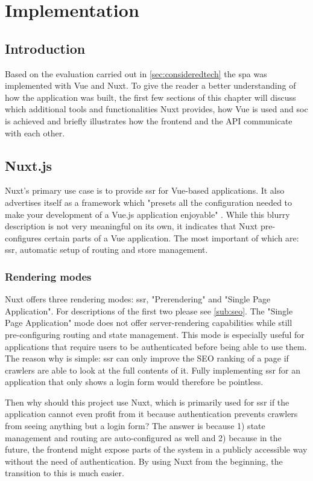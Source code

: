 \chapter[Implementation]{Implementation} \label{ch:implementation}

\section{Introduction}
Based on the evaluation carried out in \autoref{sec:consideredtech} the \acrlong{spa} was implemented with Vue and Nuxt. To give the reader a better understanding of how the application was built, the first few sections of this chapter will discuss which additional tools and functionalities Nuxt provides, how Vue is used and \acrfull{soc} is achieved and briefly illustrates how the frontend and the API communicate with each other. 

\section{Nuxt.js}
Nuxt's primary use case is to provide \acrlong{ssr} for Vue-based applications. It also advertises itself as a framework which "presets all the configuration needed to make your development of a Vue.js application enjoyable" \cite{Nuxtjs:online}. While this blurry description is not very meaningful on its own, it indicates that Nuxt pre-configures certain parts of a Vue application. The most important of which are: \acrlong{ssr}, automatic setup of routing and store management.

\subsection{Rendering modes}
Nuxt offers three rendering modes: \acrshort{ssr}, "Prerendering" and "Single Page Application". For descriptions of the first two please see \autoref{sub:seo}. The "Single Page Application" mode does not offer server-rendering capabilities while still pre-configuring routing and state management. This mode is especially useful for applications that require users to be authenticated before being able to use them. The reason why is simple: \acrlong{ssr} can only improve the SEO ranking of a page if crawlers are able to look at the full contents of it. Fully implementing \acrshort{ssr} for an application that only shows a login form would therefore be pointless. 

Then why should this project use Nuxt, which is primarily used for \acrshort{ssr} if the application cannot even profit from it because authentication prevents crawlers from seeing anything but a login form? The answer is because 1) state management and routing are auto-configured as well and 2) because in the future, the frontend might expose parts of the system in a publicly accessible way without the need of authentication. By using Nuxt from the beginning, the transition to this is much easier.

